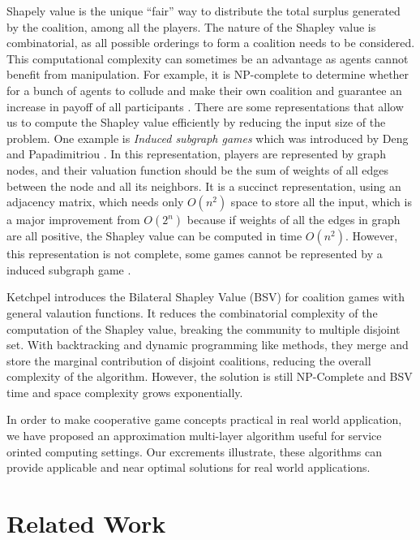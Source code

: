         Shapely value is the unique ``fair'' way to distribute the total surplus generated by the coalition, among all the players.
        The nature of the Shapley value is combinatorial, as all possible orderings to form a
        coalition needs to be considered. This computational complexity can sometimes be
        an advantage as agents cannot benefit from manipulation. For example, it is NP-complete
        to determine whether for a bunch of agents to collude and make their own coalition and guarantee
        an increase in payoff of all participants \cite{conf/aaai/YokooCSOI05}.
        There are some representations that allow us to compute the Shapley value efficiently by reducing the input size of the problem.
        One example is \emph{Induced subgraph games}
        which was introduced by Deng and Papadimitriou \cite{Deng94}. In this representation, players are represented by graph nodes, and
        their valuation function should be the sum of weights of all edges between the node and all its neighbors. It is a succinct representation, using
        an adjacency matrix, which needs only $O(n^2)$ space to store all the input, which is a major improvement from $O(2^n)$ because
        if weights of all the edges in graph are all positive, the Shapley value can be computed in time $O(n^2)$.
        However, this representation is not complete, some games cannot be represented by a induced subgraph game \cite{conf/aaai/YokooCSOI05}.

        Ketchpel introduces the Bilateral Shapley Value (BSV) \cite{conf/aaai/Ketchpel94a} for coalition games with general valaution functions.
        It reduces the combinatorial complexity of the computation of the Shapley value, breaking the community to multiple disjoint set.
        With backtracking and dynamic programming like methods, they merge and store the marginal contribution of disjoint coalitions,
        reducing the overall complexity of the algorithm. However, the solution is still NP-Complete and BSV time and space complexity grows exponentially.

        In order to make cooperative game concepts practical in real world application, we have proposed an approximation multi-layer
        algorithm useful for service orinted computing settings. Our excrements illustrate, these algorithms can provide
        applicable and near optimal solutions for real world applications.


\section{Related Work}\label{sec:BRRelatedWork}

